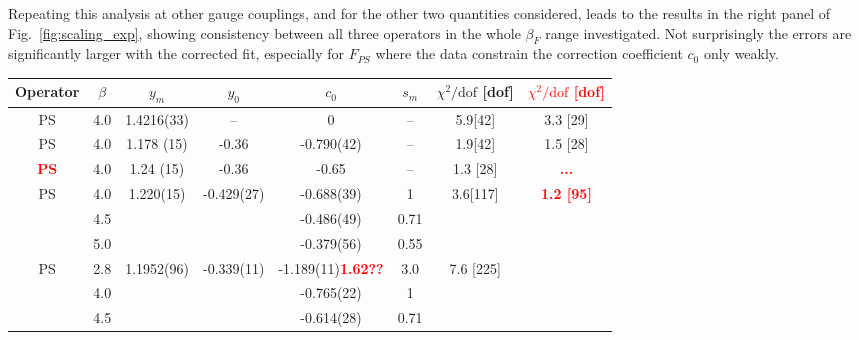 \documentclass[prl, letterpaper, amsmath, amssymb, preprintnumbers, showpacs, superscriptaddress, twocolumn]{revtex4-1}
\newcommand{\be}{\ensuremath{\beta} }
\newcommand{\chiSqdof}{\ensuremath{\chi^2 / \mbox{dof}} }
\newcommand{\fig}[1]{Fig.~\ref{#1}}
\newcommand{\TODO}[1]{\textcolor{red}{{\bf #1}}}
\begin{document}
Repeating this analysis at other gauge couplings, and for the other two quantities considered, leads to the results in the right panel of \fig{fig:scaling_exp}, showing consistency between all three operators in the whole $\be_F$ range investigated.
Not surprisingly the errors are significantly larger with the corrected fit, especially for $F_{PS}$ where the data constrain the correction coefficient $c_0$ only weakly.
\begin{table}[htdp]
  \begin{center}
    \begin{tabular}{|c|c|c|c|c|c|c|c|}
      \hline
      Operator        & \be           & $y_m$       & $y_0$         & $c_0$                     & $s_m$       & \chiSqdof [dof] & \TODO{\chiSqdof [dof]}  \\
      \hline
      \hline
      PS              & 4.0           & 1.4216(33)  & --            & 0                         & --          & 5.9[42]         & 3.3 [29]                \\
      \hline
      PS              & 4.0           & 1.178 (15)  & -0.36         & -0.790(42)                & --          & 1.9[42]         & 1.5 [28]                \\
      \hline
      \TODO{PS}       & 4.0           & 1.24 (15)   & -0.36         & -0.65                     & --          & 1.3 [28]        & \TODO{...}              \\
      \hline
      PS              & 4.0           & 1.220(15)   & -0.429(27)    & -0.688(39)                & 1           & 3.6[117]        & \TODO{1.2 [95]}         \\
                      & 4.5           &             &               & -0.486(49)                & 0.71        &                 &                         \\
                      & 5.0           &             &               & -0.379(56)                & 0.55        &                 &                         \\
      \hline
      PS              & 2.8           & 1.1952(96)  & -0.339(11)    & -1.189(11)\TODO{1.62??}   & 3.0         & 7.6 [225]       &                         \\
                      & 4.0           &             &               & -0.765(22)                & 1           &                 &                         \\
                      & 4.5           &             &               & -0.614(28)                & 0.71        &                 &                         \\

\end{tabular}
\end{center}
\end{table}
\end{document}
